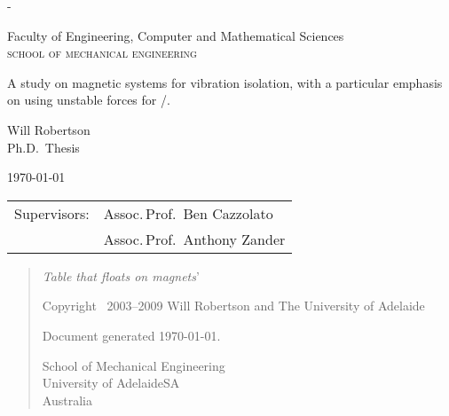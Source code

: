 
\thispagestyle{empty}
\label{titlepage}
\calccentering{\unitlength}
\begin{adjustwidth*}{\unitlength}{-\unitlength} 
\setlength{\parindent}{0pt}

\begin{flushright}
\end{flushright}

\vfill

Faculty of Engineering,
Computer and Mathematical Sciences\\
\textsc{school of mechanical engineering}

\vfill

{\Large\raggedright 
A study on magnetic systems for
vibration isolation, with a particular
emphasis on using unstable forces for
\qzs/.}

\vspace{10mm}

Will Robertson\\
Ph.D.\ Thesis
\vspace{10mm}

\today

\vfill

\vfill
    
\begin{tabular}{@{}ll}
Supervisors:    & Assoc.\,Prof.\ Ben Cazzolato  \\
                & Assoc.\,Prof.\ Anthony Zander
\end{tabular}
\end{adjustwidth*}

\newpage
\thispagestyle{empty}
\null
\vfill
\begin{quote} 
  \LARGE
  \textit{Table that floats on magnets}'

  \vfill
  \normalsize
  \raggedright
  Copyright \textcopyright\ 2003--2009 Will Robertson 
  and The University of Adelaide

  \bigskip
  Document generated \today.

  \bigskip
  School of Mechanical Engineering\\
  University of Adelaide\quad SA\\
  Australia\\
\end{quote}

